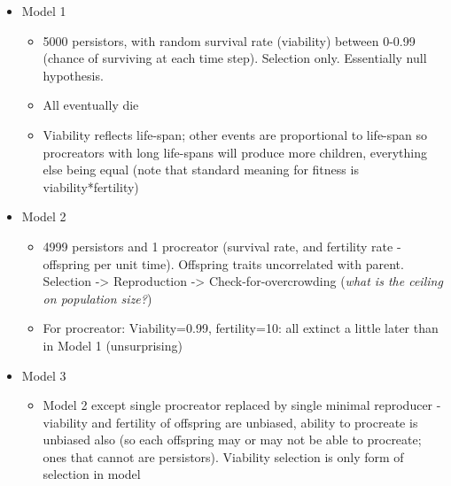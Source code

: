 \begin{itemize}
	\item
	
	Model 1
	
	
	\begin{itemize}
		\item
		
		5000 persistors, with random survival rate (viability) between
		0-0.99 (chance of surviving at each time step). Selection only.
		Essentially null hypothesis.
		
		\item
		
		All eventually die
		
		\item
		
		Viability reflects life-span; other events are proportional to
		life-span so procreators with long life-spans will produce more
		children, everything else being equal (note that standard
		meaning for fitness is viability*fertility)
		
	\end{itemize}
	\item
	
	Model 2
	
	
	\begin{itemize}
		\item
		
		4999 persistors and 1 procreator (survival rate, and fertility
		rate - offspring per unit time). Offspring traits uncorrelated
		with parent. Selection -\textgreater{} Reproduction
		-\textgreater{} Check-for-overcrowding (\emph{what is the
			ceiling on population size?})
		
		\item
		
		For procreator: Viability=0.99, fertility=10: all extinct a
		little later than in Model 1 (unsurprising)
		
	\end{itemize}
	\item
	
	Model 3
	
	
	\begin{itemize}
		\item
		
		Model 2 except single procreator replaced by single minimal
		reproducer - viability and fertility of offspring are unbiased,
		ability to procreate is unbiased also (so each offspring may or
		may not be able to procreate; ones that cannot are persistors).
		Viability selection is only form of selection in model
		

\end{itemize}
\end{itemize}
